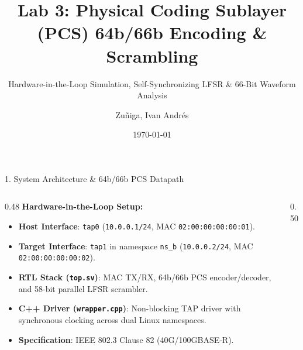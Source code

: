 \documentclass[aspectratio=169, 10pt]{beamer}
\title{Lab 3: Physical Coding Sublayer (PCS) 64b/66b Encoding \& Scrambling}
\subtitle{Hardware-in-the-Loop Simulation, Self-Synchronizing LFSR \& 66-Bit Waveform Analysis}
\date{\today}
\author{Zuñiga, Ivan Andrés}
\institute{Fundación Fulgor}
\begin{document}
\maketitle

\begin{frame}{1. System Architecture \& 64b/66b PCS Datapath}
\vspace{1mm}
\begin{columns}[c]
    \begin{column}{0.48\textwidth}
        \textbf{Hardware-in-the-Loop Setup:}
        \begin{itemize}\small
            \item \textbf{Host Interface}: \texttt{tap0} (\texttt{10.0.0.1/24}, MAC \texttt{02:00:00:00:00:01}).
            \item \textbf{Target Interface}: \texttt{tap1} in namespace \texttt{ns\_b} (\texttt{10.0.0.2/24}, MAC \texttt{02:00:00:00:00:02}).
            \item \textbf{RTL Stack (\texttt{top.sv})}: MAC TX/RX, 64b/66b PCS encoder/decoder, and 58-bit parallel LFSR scrambler.
            \item \textbf{C++ Driver (\texttt{wrapper.cpp})}: Non-blocking TAP driver with synchronous clocking across dual Linux namespaces.
            \item \textbf{Specification}: IEEE 802.3 Clause 82 (40G/100GBASE-R).
        \end{itemize}
    \end{column}
    
    \begin{column}{0.50\textwidth}
        \begin{tcolorbox}[colback=BgSlate, colframe=PrimaryBlue, title=\footnotesize IEEE 802.3 Clause 82 PCS Architecture, arc=2mm, top=1.5mm, bottom=1.5mm]
            \centering
\end{tcolorbox}
\end{column}
\end{columns}
\end{frame}
\end{document}
